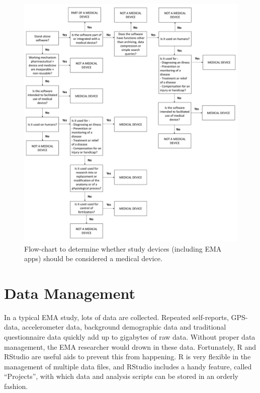 \documentclass[]{book}
\begin{document}
\begin{figure}

{\centering \includegraphics[width=0.9\linewidth]{images/outcomes/Flow_MD} 

}

\caption{Flow-chart to determine whether study devices (including EMA apps) should be considered a medical device.}\label{fig:fig3b}
\end{figure}

\chapter{Data Management}\label{datamanagement}


In a typical EMA study, lots of data are collected. Repeated
self-reports, GPS-data, accelerometer data, background demographic data
and traditional questionnaire data quickly add up to gigabytes of raw
data. Without proper data management, the EMA researcher would drown in
these data. Fortunately, R and RStudio are useful aids to prevent this
from happening. R is very flexible in the management of multiple data
files, and RStudio includes a handy feature, called ``Projects'', with
which data and analysis scripts can be stored in an orderly fashion.
\end{document}
